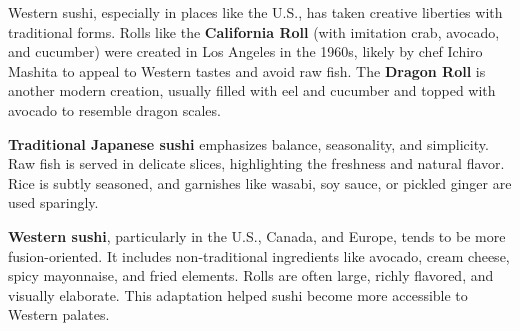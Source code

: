 \documentclass[landscape, a4paper]{article}
\newcommand\alert[1]{\textcolor{PrimaryColor}{\textbf{#1}}}
\begin{document}
\begin{minipage}[t]{0.31\textwidth}
	Western sushi, especially in places like the U.S., has taken creative liberties with traditional forms. Rolls like the \alert{California Roll} (with imitation crab, avocado, and cucumber) were created in Los Angeles in the 1960s, likely by chef Ichiro Mashita to appeal to Western tastes and avoid raw fish. The \alert{Dragon Roll} is another modern creation, usually filled with eel and cucumber and topped with avocado to resemble dragon scales.

	\alert{Traditional Japanese sushi} emphasizes balance, seasonality, and simplicity. Raw fish is served in delicate slices, highlighting the freshness and natural flavor. Rice is subtly seasoned, and garnishes like wasabi, soy sauce, or pickled ginger are used sparingly.

	\alert{Western sushi}, particularly in the U.S., Canada, and Europe, tends to be more fusion-oriented. It includes non-traditional ingredients like avocado, cream cheese, spicy mayonnaise, and fried elements. Rolls are often large, richly flavored, and visually elaborate. This adaptation helped sushi become more accessible to Western palates.
\end{minipage}%

\newpage
\end{document}
